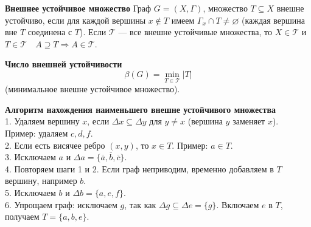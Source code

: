\textbf{Внешнее устойчивое множество}
Граф $G = (X, \Gamma)$, множество $T \subseteq X$ внешне устойчиво, если для каждой вершины $x \notin T$ имеем $\Gamma_x \cap T \neq \varnothing$ (каждая вершина вне $T$ соединена с $T$). Если $\mathcal{T}$ — все внешне устойчивые множества, то $X \in \mathcal{T}$ и $T \in \mathcal{T} \quad A \supseteq T \Rightarrow A \in \mathcal{T}$.

\textbf{Число внешней устойчивости}
\[\beta(G) = \min_{T \in \mathcal{T}} |T|\] (минимальное внешне устойчивое множество).

\textbf{Алгоритм нахождения наименьшего внешне устойчивого множества}
\\1. Удаляем вершину $x$, если $\Delta x \subseteq \Delta y$ для $y \neq x$ (вершина $y$ заменяет $x$). Пример: удаляем $c, d, f$.
\\2. Если есть висячее ребро $(x, y)$, то $x \in T$. Пример: $a \in T$.
\\3. Исключаем $a$ и $\Delta a = \{\overline{a}, \overline{b}, \overline{c}\}$.
\\4. Повторяем шаги 1 и 2. Если граф неприводим, временно добавляем в $T$ вершину, например $b$.
\\5. Исключаем $b$ и $\Delta b = \{a, e, f\}$.
\\6. Упрощаем граф: исключаем $g$, так как $\Delta g \subseteq \Delta e = \{g\}$. Включаем $e$ в $T$, получаем $T = \{a, b, e\}$.